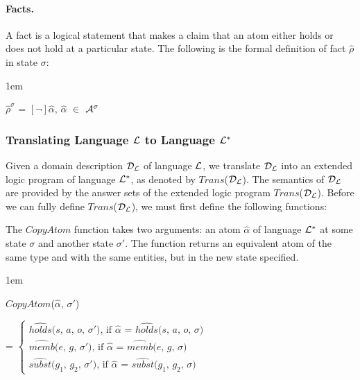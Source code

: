 \documentclass[glov2,twocolumn,final]{svjour2}
\newenvironment{vquote}
  {\begin{list}{}{\leftmargin 1em}\item[]}
  {\end{list}}
\begin{document}
        \paragraph{Facts.}

          A fact is a logical statement that makes a claim that an atom either
          holds or does not hold at a particular state. The following is the
          formal definition of fact $\hat{\rho}$ in state $\sigma$:

          \begin{vquote}
            $\hat{\rho}^{\sigma}$ =
            $[\lnot]$$\hat{\alpha}$, $\hat{\alpha}$ $\in$ ${\cal A}^{\sigma}$
          \end{vquote}

      \subsubsection{Translating Language ${\cal L}$ to Language ${\cal L^{*}}$}

        Given a domain description ${\cal D_{L}}$ of language ${\cal L}$, we
        translate ${\cal D_{L}}$ into an extended logic program of language
        ${\cal L^{*}}$, as denoted by $Trans$(${\cal D_{L}}$). The semantics of
        ${\cal D_{L}}$ are provided by the answer sets of the extended logic
        program $Trans$(${\cal D_{L}}$). Before we can fully define
        $Trans$(${\cal D}_{\cal L}$), we must first define the following
        functions:

        The $CopyAtom$ function takes two arguments: an atom $\hat{\alpha}$
        of language ${\cal L}^{*}$ at some state $\sigma$ and another state
        $\sigma'$. The function returns an equivalent atom of the same type
        and with the same entities, but in the new state specified.

        \begin{vquote}
          $CopyAtom$($\hat{\alpha}$, $\sigma'$)

          \hspace{1em}
          =
          \begin{math}
            \begin{cases}
              \mbox{$\hat{holds}$($s$, $a$, $o$, $\sigma'$), if $\hat{\alpha}$ = $\hat{holds}$($s$, $a$, $o$, $\sigma$)} \\
              \mbox{$\hat{memb}$($e$, $g$, $\sigma'$), if $\hat{\alpha}$ = $\hat{memb}$($e$, $g$, $\sigma$)} \\
              \mbox{$\hat{subst}$($g_{1}$, $g_{2}$, $\sigma'$), if $\hat{\alpha}$ = $\hat{subst}$($g_{1}$, $g_{2}$, $\sigma$)}
            \end{cases}
          \end{math}
        \end{vquote}
\end{document}
